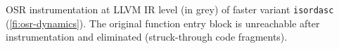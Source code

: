 \label{fig:isordascto} OSR instrumentation at LLVM IR level (in grey) of faster variant {\tt isordasc} (\myfigure\ref{fi:osr-dynamics}). The original function entry block is unreachable after instrumentation and eliminated (struck-through code fragments).